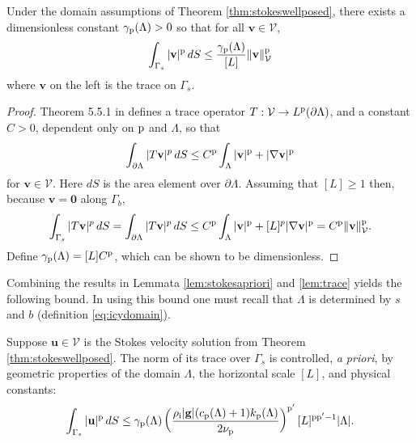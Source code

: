 \documentclass[hidelinks,onefignum,onetabnum,final]{siamart220329}  %
\newcommand{\grad}{\nabla}
\newcommand{\bg}{\mathbf{g}}
\newcommand{\bu}{\mathbf{u}}
\newcommand{\bv}{\mathbf{v}}
\newcommand{\bzero}{\bm{0}}
\newcommand{\cV}{\mathcal{V}}
\newcommand{\pp}{{\text{\textnormal{p}}}}
\newcommand{\rhoi}{\rho_{\text{i}}}
\begin{document}
\begin{lemma} \label{lem:trace}
Under the domain assumptions of Theorem \ref{thm:stokeswellposed}, there exists a dimensionless constant $\gamma_{\pp}(\Lambda)>0$ so that for all $\bv \in \cV$,
\begin{equation}
\int_{\Gamma_s} |\bv|^\pp \,dS \le \frac{\gamma_{\pp}(\Lambda)}{[L]} \|\bv\|_{\cV}^\pp \label{eq:trace}
\end{equation}
where $\bv$ on the left is the trace on $\Gamma_s$.
\end{lemma}

\begin{proof}
Theorem 5.5.1 in \cite{Evans2010} defines a trace operator $T:\cV\to L^\pp(\partial\Lambda)$, and a constant $C>0$, dependent only on $\pp$ and $\Lambda$, so that
\begin{equation}
\int_{\partial\Lambda} |T\bv|^p\,dS \le C^\pp \int_{\Lambda} |\bv|^\pp + |\grad\bv|^\pp \label{eq:tracework}
\end{equation}
for $\bv\in\cV$.  Here $dS$ is the area element over $\partial\Lambda$.  Assuming that $[L] \ge 1$ then, because $\bv=\bzero$ along $\Gamma_b$,
\begin{equation}
\int_{\Gamma_s} |T\bv|^p\,dS = \int_{\partial\Lambda} |T\bv|^p\,dS \le C^\pp \int_{\Lambda} |\bv|^\pp + [L]^p |\grad\bv|^\pp = C^\pp \|\bv\|_{\cV}^\pp. \label{eq:traceworktwo}
\end{equation}
Define $\gamma_{\pp}(\Lambda)=[L] C^\pp$, which can be shown to be dimensionless.
\end{proof}

Combining the results in Lemmata \ref{lem:stokesapriori} and \ref{lem:trace} yields the following bound.  In using this bound one must recall that $\Lambda$ is determined by $s$ and $b$ (definition \eqref{eq:icydomain}).

\begin{corollary} \label{cor:surfacetracebound}
Suppose $\bu\in\cV$ is the Stokes velocity solution from Theorem \ref{thm:stokeswellposed}.  The norm of its trace over $\Gamma_s$ is controlled, \emph{a priori}, by geometric properties of the domain $\Lambda$, the horizontal scale $[L]$, and physical constants:
\begin{equation}
\int_{\Gamma_s} |\bu|^\pp \,dS \le \gamma_{\pp}(\Lambda) \left(\frac{\rhoi |\bg| (c_{\pp}(\Lambda) + 1) k_{\pp}(\Lambda)}{2 \nu_\pp}\right)^{\pp'} [L]^{\pp\pp'-1} |\Lambda|. \label{eq:surfacetracebound}
\end{equation}
\end{corollary}
\end{document}
